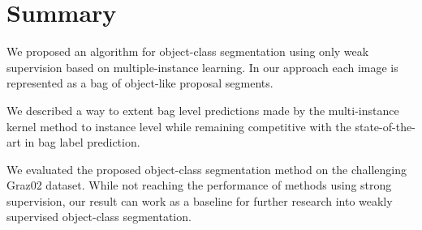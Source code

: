 \section{Summary}

We proposed an algorithm for object-class segmentation using only weak
supervision based on multiple-instance learning. In our approach each image is
represented as a bag of object-like proposal segments.

We described a way to extent bag level predictions made by the multi-instance
kernel method to instance level while remaining competitive with the
state-of-the-art in bag label prediction.

We evaluated the proposed object-class segmentation method on the challenging
Graz02 dataset. While not reaching the performance of methods using strong
supervision, our result can work as a baseline for further research into weakly
supervised object-class segmentation.
